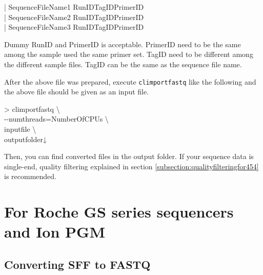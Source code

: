 \documentclass[titlepage,10pt,a4paper,english]{jsbook}
\newenvironment{content}{\begin{shaded}\vspace{-1em}\raggedright\ttfamily\footnotesize\setlength{\baselineskip}{1.4em}}{\end{shaded}\vspace{-1em}}
\newenvironment{cmd}{\begin{oframed}\raggedright\ttfamily\footnotesize\setlength{\baselineskip}{1.4em}}{\end{oframed}\vspace{-1em}}
\begin{document}
\begin{content}
| SequenceFileName1 RunID{\textunderscore}{\textunderscore}TagID{\textunderscore}{\textunderscore}PrimerID\\
| SequenceFileName2 RunID{\textunderscore}{\textunderscore}TagID{\textunderscore}{\textunderscore}PrimerID\\
| SequenceFileName3 RunID{\textunderscore}{\textunderscore}TagID{\textunderscore}{\textunderscore}PrimerID
\end{content}

Dummy RunID and PrimerID is acceptable.
PrimerID need to be the same among the sample used the same primer set.
TagID need to be different among the different sample files.
TagID can be the same as the sequence file name.

After the above file was prepared, execute \texttt{climportfastq} like the following and the above file should be given as an input file.

\begin{cmd}
{\textgreater} climportfastq {\textbackslash}\\
{-}{-}numthreads=NumberOfCPUs {\textbackslash}\\
inputfile {\textbackslash}\\
outputfolder↓
\end{cmd}

Then, you can find converted files in the output folder.
If your sequence data is single-end, quality filtering explained in section \ref{subsection:qualityfilteringfor454} is recommended.

\section{For Roche GS series sequencers and Ion PGM}

\subsection{Converting SFF to FASTQ}
\end{document}

